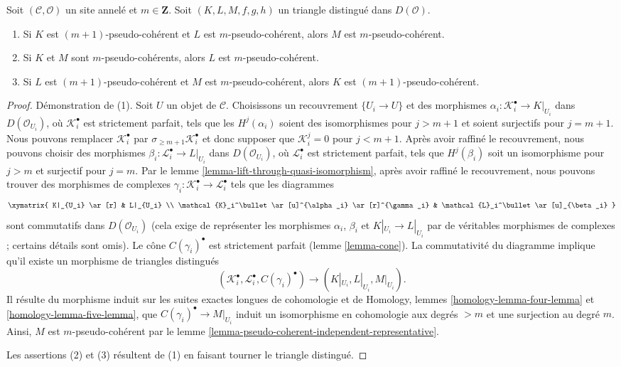 \begin{lemma}
\label{lemma-cone-pseudo-coherent}
Soit $(\mathcal{C}, \mathcal{O})$ un site annelé et $m \in \mathbf{Z}$.
Soit $(K, L, M, f, g, h)$ un triangle distingué dans $D(\mathcal{O})$.
\begin{enumerate}
\item Si $K$ est $(m + 1)$-pseudo-cohérent et $L$ est $m$-pseudo-cohérent,
alors $M$ est $m$-pseudo-cohérent.
\item Si $K$ et $M$ sont $m$-pseudo-cohérents, alors $L$ est
$m$-pseudo-cohérent.
\item Si $L$ est $(m + 1)$-pseudo-cohérent et $M$ est
$m$-pseudo-cohérent, alors $K$ est $(m + 1)$-pseudo-cohérent.
\end{enumerate}
\end{lemma}

\begin{proof}
Démonstration de (1). Soit $U$ un objet de $\mathcal{C}$. Choisissons un
recouvrement $\{U_i \to U\}$ et des morphismes
$\alpha_i : \mathcal{K}_i^\bullet \to K|_{U_i}$ dans
$D(\mathcal{O}_{U_i})$, où $\mathcal{K}_i^\bullet$ est strictement parfait,
tels que les $H^j(\alpha_i)$ soient des isomorphismes pour $j > m + 1$ et
soient surjectifs pour $j = m + 1$. Nous pouvons remplacer
$\mathcal{K}_i^\bullet$ par
$\sigma_{\geq m + 1}\mathcal{K}_i^\bullet$ et donc supposer que
$\mathcal{K}_i^j = 0$ pour $j < m + 1$. Après avoir raffiné le recouvrement,
nous pouvons choisir des morphismes
$\beta_i : \mathcal{L}_i^\bullet \to L|_{U_i}$ dans
$D(\mathcal{O}_{U_i})$, où $\mathcal{L}_i^\bullet$ est strictement parfait,
tels que $H^j(\beta_i)$ soit un isomorphisme pour $j > m$ et surjectif pour
$j = m$. Par le lemme \ref{lemma-lift-through-quasi-isomorphism}, après avoir
raffiné le recouvrement, nous pouvons trouver des morphismes de complexes
$\gamma_i : \mathcal{K}_i^\bullet \to \mathcal{L}_i^\bullet$ tels que les
diagrammes
$$
\xymatrix{
K|_{U_i} \ar[r] & L|_{U_i} \\
\mathcal{K}_i^\bullet \ar[u]^{\alpha_i} \ar[r]^{\gamma_i} &
\mathcal{L}_i^\bullet \ar[u]_{\beta_i}
}
$$
sont commutatifs dans $D(\mathcal{O}_{U_i})$ (cela exige de représenter les
morphismes $\alpha_i$, $\beta_i$ et $K|_{U_i} \to L|_{U_i}$ par de véritables
morphismes de complexes ; certains détails sont omis). Le cône
$C(\gamma_i)^\bullet$ est strictement parfait (lemme \ref{lemma-cone}).
La commutativité du diagramme implique qu'il existe un morphisme de triangles
distingués
$$
(\mathcal{K}_i^\bullet, \mathcal{L}_i^\bullet, C(\gamma_i)^\bullet)
\longrightarrow
(K|_{U_i}, L|_{U_i}, M|_{U_i}).
$$
Il résulte du morphisme induit sur les suites exactes longues de cohomologie
et de Homology, lemmes \ref{homology-lemma-four-lemma} et
\ref{homology-lemma-five-lemma}, que
$C(\gamma_i)^\bullet \to M|_{U_i}$ induit un isomorphisme en cohomologie aux
degrés $> m$ et une surjection au degré $m$. Ainsi, $M$ est
$m$-pseudo-cohérent par le lemme
\ref{lemma-pseudo-coherent-independent-representative}.

\medskip\noindent
Les assertions (2) et (3) résultent de (1) en faisant tourner le triangle
distingué.
\end{proof}

